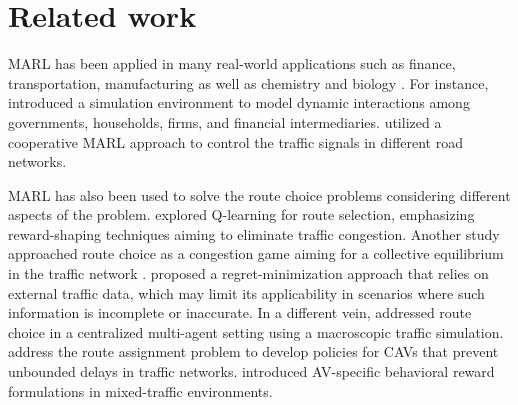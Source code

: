 \section{Related work}
\label{sec:related_work}

MARL has been applied in many real-world applications such as finance, transportation, manufacturing \cite{Zhou_2024} as well as chemistry and biology \cite{NING202473}. For instance, \citet{mi2024taxaidynamiceconomicsimulator} introduced a simulation environment to model dynamic interactions among governments, households, firms, and financial intermediaries. \citet{Ma2020FeudalMD} utilized a cooperative MARL approach to control the traffic signals in different road networks. 


MARL has also been used to solve the route choice problems considering different aspects of the problem. \citet{AgentRewardShaping} explored Q-learning for route selection, emphasizing reward-shaping techniques aiming to eliminate traffic congestion. Another study approached route choice as a congestion game aiming for a collective equilibrium in the traffic network \cite{ZHOU2020124895}. \citet{regret_route_choice} proposed a regret-minimization approach \cite{Blum_Mansour_2007} that relies on external traffic data, which may limit its applicability in scenarios where such information is incomplete or inaccurate. In a different vein, \citet{Thomasini+2023} addressed route choice in a centralized multi-agent setting using a macroscopic traffic simulation. \citet{lazar2021learningdynamicallyrouteautonomous} address the route assignment problem to develop policies for CAVs that prevent unbounded delays in traffic networks. \citet{akman2024impact} introduced AV-specific behavioral reward formulations in mixed-traffic environments.




